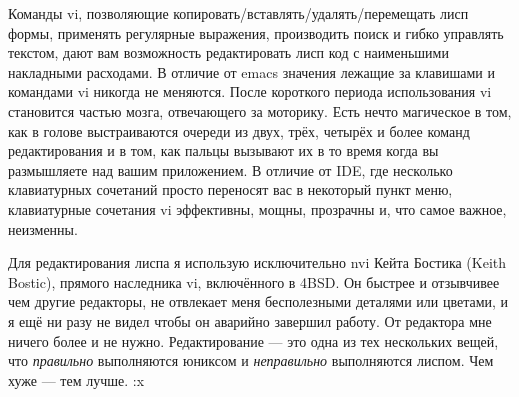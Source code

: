Команды vi, позволяющие копировать/вставлять/удалять/перемещать лисп формы, применять регулярные выражения, производить поиск и гибко управлять текстом, дают вам возможность редактировать лисп код с наименьшими накладными расходами. В отличие от emacs значения лежащие за клавишами и командами vi никогда не меняются. После короткого периода использования vi становится частью мозга, отвечающего за моторику. Есть нечто магическое в том, как в голове выстраиваются очереди из двух, трёх, четырёх и более команд редактирования и в том, как пальцы вызывают их в то время когда вы размышляете над вашим приложением. В отличие от IDE, где несколько клавиатурных сочетаний просто переносят вас в некоторый пункт меню, клавиатурные сочетания vi эффективны, мощны, прозрачны и, что самое важное, неизменны.

Для редактирования лиспа я использую исключительно nvi Кейта Бостика (Keith Bostic), прямого наследника vi, включённого в 4BSD. Он быстрее и отзывчивее чем другие редакторы, не отвлекает меня бесполезными деталями или цветами, и я ещё ни разу не видел чтобы он аварийно завершил работу. От редактора мне ничего более и не нужно. Редактирование --- это одна из тех нескольких вещей, что \emph{правильно} выполняются юниксом и \emph{неправильно} выполняются лиспом. Чем хуже --- тем лучше. :x

